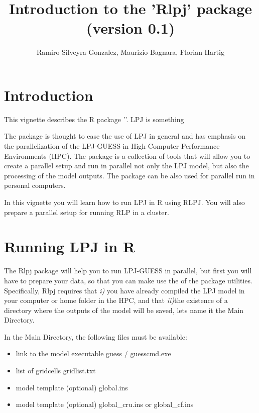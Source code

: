 \documentclass{article}
\newcommand{\R}{{\normalfont\textsf{R }}{}}
\begin{document}








\title{Introduction to the 'Rlpj' package\\(version 0.1)}

\author{Ramiro Silveyra Gonzalez, Maurizio Bagnara, Florian Hartig}
\maketitle

\section{Introduction}

This vignette describes the \R package '\verb@Rlpj@'. LPJ is something


The \verb@LPJ@ package is thought to ease the use of LPJ in general and has emphasis on the parallelization of the LPJ-GUESS in High Computer Performance Environments (HPC). The package is a collection of tools that will allow you to create a parallel setup and run in parallel not only the LPJ model, but also the processing of the model outputs. The package can be also used for parallel run in personal computers.

In this vignette you will learn how to run LPJ in R using RLPJ. You will also prepare a parallel setup for running RLP in a cluster.


\section{Running LPJ in R}



The Rlpj package will help you to run LPJ-GUESS in parallel,  but first you will have to prepare your data, so that you can make use the of the package utilities. Specifically, Rlpj requires that \emph{i)} you have already compiled the LPJ model in your computer or home folder in the HPC, and that \emph{ii)}the existence of a directory where the outputs of the model will be saved, lets name it the Main Directory.


In the Main Directory, the following files must be available:

\begin{itemize}
\item  link to the model executable \hfill  guess / guesscmd.exe
\item  list of gridcells    \hfill gridlist.txt
\item  model template  (optional)            \hfill  global.ins
\item model template  (optional)       \hfill  global\_cru.ins or global\_cf.ins
\end{itemize}
\end{document}
